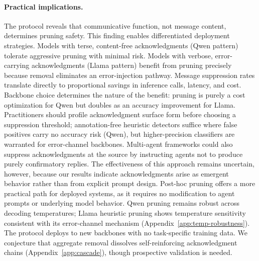 \paragraph{Practical implications.}
The protocol reveals that communicative function, not message content, determines pruning safety. This finding enables differentiated deployment strategies. Models with terse, content-free acknowledgments (Qwen pattern) tolerate aggressive pruning with minimal risk. Models with verbose, error-carrying acknowledgments (Llama pattern) benefit from pruning precisely because removal eliminates an error-injection pathway. Message suppression rates translate directly to proportional savings in inference calls, latency, and cost. Backbone choice determines the nature of the benefit: pruning is purely a cost optimization for Qwen but doubles as an accuracy improvement for Llama. Practitioners should profile acknowledgment surface form before choosing a suppression threshold; annotation-free heuristic detectors suffice where false positives carry no accuracy risk (Qwen), but higher-precision classifiers are warranted for error-channel backbones. Multi-agent frameworks could also suppress acknowledgments at the source by instructing agents not to produce purely confirmatory replies. The effectiveness of this approach remains uncertain, however, because our results indicate acknowledgments arise as emergent behavior rather than from explicit prompt design. Post-hoc pruning offers a more practical path for deployed systems, as it requires no modification to agent prompts or underlying model behavior. Qwen pruning remains robust across decoding temperatures; Llama heuristic pruning shows temperature sensitivity consistent with its error-channel mechanism (Appendix~\ref{app:temp-robustness}). The protocol deploys to new backbones with no task-specific training data. We conjecture that aggregate removal dissolves self-reinforcing acknowledgment chains (Appendix~\ref{app:cascade}), though prospective validation is needed.

